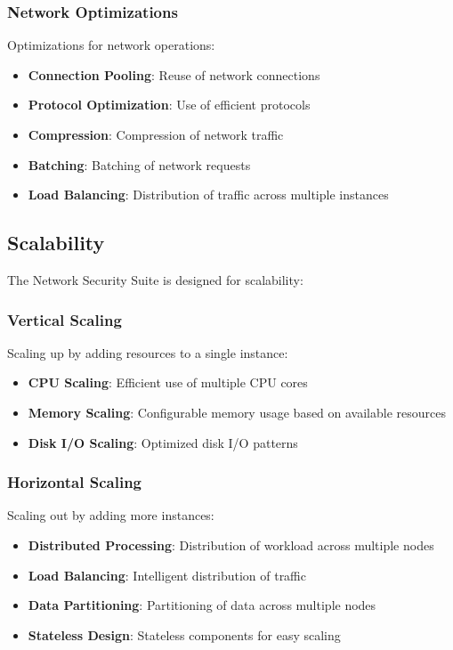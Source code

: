 \subsubsection{Network Optimizations}
Optimizations for network operations:

\begin{itemize}
    \item \textbf{Connection Pooling}: Reuse of network connections
    \item \textbf{Protocol Optimization}: Use of efficient protocols
    \item \textbf{Compression}: Compression of network traffic
    \item \textbf{Batching}: Batching of network requests
    \item \textbf{Load Balancing}: Distribution of traffic across multiple instances
\end{itemize}

\subsection{Scalability}
The Network Security Suite is designed for scalability:

\subsubsection{Vertical Scaling}
Scaling up by adding resources to a single instance:

\begin{itemize}
    \item \textbf{CPU Scaling}: Efficient use of multiple CPU cores
    \item \textbf{Memory Scaling}: Configurable memory usage based on available resources
    \item \textbf{Disk I/O Scaling}: Optimized disk I/O patterns
\end{itemize}

\subsubsection{Horizontal Scaling}
Scaling out by adding more instances:

\begin{itemize}
    \item \textbf{Distributed Processing}: Distribution of workload across multiple nodes
    \item \textbf{Load Balancing}: Intelligent distribution of traffic
    \item \textbf{Data Partitioning}: Partitioning of data across multiple nodes
    \item \textbf{Stateless Design}: Stateless components for easy scaling
\end{itemize}

